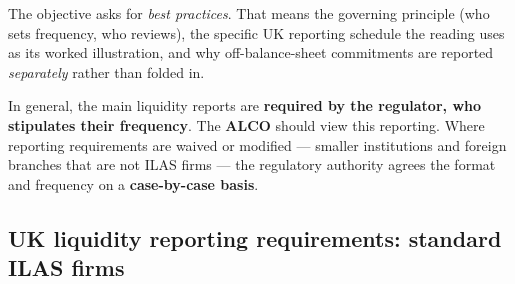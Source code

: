 \gapbadge
{}

\begin{lrgapbox}
The objective asks for \emph{best practices}. That means the governing principle (who sets frequency, who reviews), the specific UK reporting schedule the reading uses as its worked illustration, and why off-balance-sheet commitments are reported \emph{separately} rather than folded in.
\end{lrgapbox}

\begin{lrkeybox}
In general, the main liquidity reports are \textbf{required by the regulator, who stipulates their frequency}. The \textbf{ALCO} should view this reporting. Where reporting requirements are waived or modified --- smaller institutions and foreign branches that are not ILAS firms --- the regulatory authority agrees the format and frequency on a \textbf{case-by-case basis}.
\end{lrkeybox}

\subsection{UK liquidity reporting requirements: standard ILAS firms}

